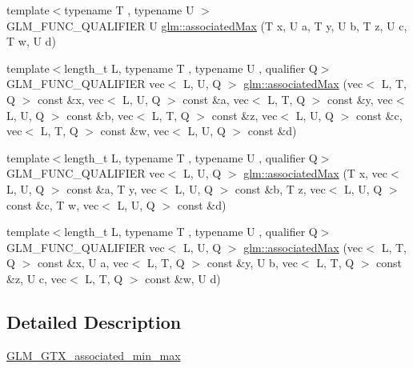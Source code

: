 \begin{DoxyCompactItemize}
\item 
{\footnotesize template$<$typename T , typename U $>$ }\\G\+L\+M\+\_\+\+F\+U\+N\+C\+\_\+\+Q\+U\+A\+L\+I\+F\+I\+ER U \hyperlink{group__gtx__associated__min__max_ga3038ffcb43eaa6af75897a99a5047ccc}{glm\+::associated\+Max} (T x, U a, T y, U b, T z, U c, T w, U d)
\item 
{\footnotesize template$<$length\+\_\+t L, typename T , typename U , qualifier Q$>$ }\\G\+L\+M\+\_\+\+F\+U\+N\+C\+\_\+\+Q\+U\+A\+L\+I\+F\+I\+ER vec$<$ L, U, Q $>$ \hyperlink{group__gtx__associated__min__max_gaf5ab0c428f8d1cd9e3b45fcfbf6423a6}{glm\+::associated\+Max} (vec$<$ L, T, Q $>$ const \&x, vec$<$ L, U, Q $>$ const \&a, vec$<$ L, T, Q $>$ const \&y, vec$<$ L, U, Q $>$ const \&b, vec$<$ L, T, Q $>$ const \&z, vec$<$ L, U, Q $>$ const \&c, vec$<$ L, T, Q $>$ const \&w, vec$<$ L, U, Q $>$ const \&d)
\item 
{\footnotesize template$<$length\+\_\+t L, typename T , typename U , qualifier Q$>$ }\\G\+L\+M\+\_\+\+F\+U\+N\+C\+\_\+\+Q\+U\+A\+L\+I\+F\+I\+ER vec$<$ L, U, Q $>$ \hyperlink{group__gtx__associated__min__max_ga11477c2c4b5b0bfd1b72b29df3725a9d}{glm\+::associated\+Max} (T x, vec$<$ L, U, Q $>$ const \&a, T y, vec$<$ L, U, Q $>$ const \&b, T z, vec$<$ L, U, Q $>$ const \&c, T w, vec$<$ L, U, Q $>$ const \&d)
\item 
{\footnotesize template$<$length\+\_\+t L, typename T , typename U , qualifier Q$>$ }\\G\+L\+M\+\_\+\+F\+U\+N\+C\+\_\+\+Q\+U\+A\+L\+I\+F\+I\+ER vec$<$ L, U, Q $>$ \hyperlink{group__gtx__associated__min__max_gab9c3dd74cac899d2c625b5767ea3b3fb}{glm\+::associated\+Max} (vec$<$ L, T, Q $>$ const \&x, U a, vec$<$ L, T, Q $>$ const \&y, U b, vec$<$ L, T, Q $>$ const \&z, U c, vec$<$ L, T, Q $>$ const \&w, U d)
\end{DoxyCompactItemize}


\subsection{Detailed Description}
\hyperlink{group__gtx__associated__min__max}{G\+L\+M\+\_\+\+G\+T\+X\+\_\+associated\+\_\+min\+\_\+max} 